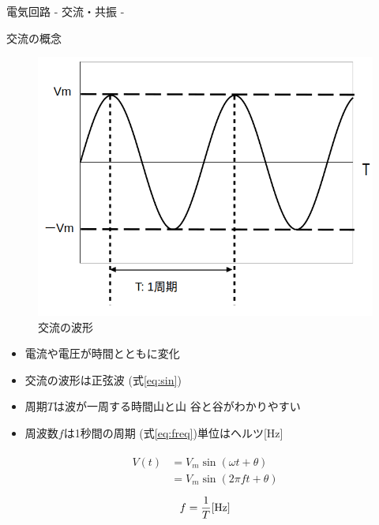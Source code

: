     {\large 電気回路 - 交流・共振 -}

    \begin{multicols}{3}
        \begin{itembox}[l]{交流の概念}
            \begin{figure}[H]
                \label{fig:ac}
                \includegraphics[width=0.9\linewidth]{fig/交流概念.png}
                \caption{交流の波形}
            \end{figure}
            \begin{itemize}
                \item 電流や電圧が時間とともに変化
                \item 交流の波形は正弦波 (式\ref{eq:sin})
                \item 周期$T$は波が一周する時間\newline 山と山 谷と谷がわかりやすい
                \item 周波数$f$は1秒間の周期 (式\ref{eq:freq})\newline 単位はヘルツ[Hz]
            \end{itemize}
            \begin{align}
                \label{eq:sin}
                \begin{split}
                    V(t) &= V_m \sin(\omega t + \theta)\\
                    &= V_m \sin(2\pi f t + \theta)
                \end{split}
            \end{align}
            \begin{align}
                \label{eq:freq}
                f=\dfrac{1}{T} \space \text{[Hz]}
            \end{align}
        \end{itembox}


\end{multicols}
